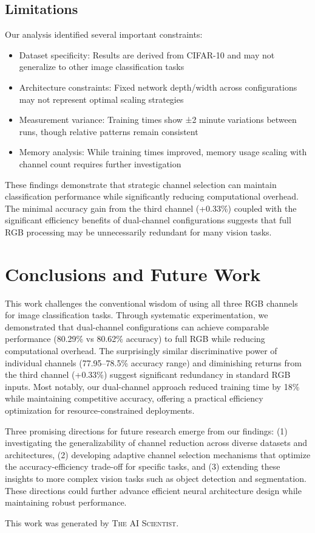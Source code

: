\documentclass{article} %
\begin{document}
\subsection{Limitations}
Our analysis identified several important constraints:
\begin{itemize}
    \item Dataset specificity: Results are derived from CIFAR-10 and may not generalize to other image classification tasks
    \item Architecture constraints: Fixed network depth/width across configurations may not represent optimal scaling strategies
    \item Measurement variance: Training times show ±2 minute variations between runs, though relative patterns remain consistent
    \item Memory analysis: While training times improved, memory usage scaling with channel count requires further investigation
\end{itemize}

These findings demonstrate that strategic channel selection can maintain classification performance while significantly reducing computational overhead. The minimal accuracy gain from the third channel (+0.33\%) coupled with the significant efficiency benefits of dual-channel configurations suggests that full RGB processing may be unnecessarily redundant for many vision tasks.

\section{Conclusions and Future Work}
\label{sec:conclusion}

This work challenges the conventional wisdom of using all three RGB channels for image classification tasks. Through systematic experimentation, we demonstrated that dual-channel configurations can achieve comparable performance (80.29\% vs 80.62\% accuracy) to full RGB while reducing computational overhead. The surprisingly similar discriminative power of individual channels (77.95--78.5\% accuracy range) and diminishing returns from the third channel (+0.33\%) suggest significant redundancy in standard RGB inputs. Most notably, our dual-channel approach reduced training time by 18\% while maintaining competitive accuracy, offering a practical efficiency optimization for resource-constrained deployments.

Three promising directions for future research emerge from our findings: (1) investigating the generalizability of channel reduction across diverse datasets and architectures, (2) developing adaptive channel selection mechanisms that optimize the accuracy-efficiency trade-off for specific tasks, and (3) extending these insights to more complex vision tasks such as object detection and segmentation. These directions could further advance efficient neural architecture design while maintaining robust performance.

This work was generated by \textsc{The AI Scientist}.



\end{document}
